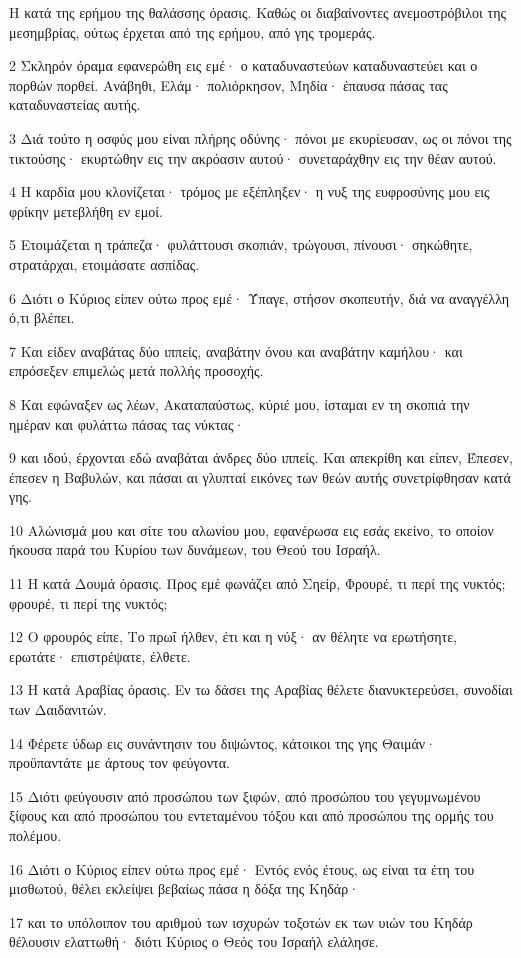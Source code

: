 \par Η κατά της ερήμου της θαλάσσης όρασις. Καθώς οι διαβαίνοντες ανεμοστρόβιλοι της μεσημβρίας, ούτως έρχεται από της ερήμου, από γης τρομεράς.
\par 2 Σκληρόν όραμα εφανερώθη εις εμέ· ο καταδυναστεύων καταδυναστεύει και ο πορθών πορθεί. Ανάβηθι, Ελάμ· πολιόρκησον, Μηδία· έπαυσα πάσας τας καταδυναστείας αυτής.
\par 3 Διά τούτο η οσφύς μου είναι πλήρης οδύνης· πόνοι με εκυρίευσαν, ως οι πόνοι της τικτούσης· εκυρτώθην εις την ακρόασιν αυτού· συνεταράχθην εις την θέαν αυτού.
\par 4 Η καρδία μου κλονίζεται· τρόμος με εξέπληξεν· η νυξ της ευφροσύνης μου εις φρίκην μετεβλήθη εν εμοί.
\par 5 Ετοιμάζεται η τράπεζα· φυλάττουσι σκοπιάν, τρώγουσι, πίνουσι· σηκώθητε, στρατάρχαι, ετοιμάσατε ασπίδας.
\par 6 Διότι ο Κύριος είπεν ούτω προς εμέ· Ύπαγε, στήσον σκοπευτήν, διά να αναγγέλλη ό,τι βλέπει.
\par 7 Και είδεν αναβάτας δύο ιππείς, αναβάτην όνου και αναβάτην καμήλου· και επρόσεξεν επιμελώς μετά πολλής προσοχής.
\par 8 Και εφώναξεν ως λέων, Ακαταπαύστως, κύριέ μου, ίσταμαι εν τη σκοπιά την ημέραν και φυλάττω πάσας τας νύκτας·
\par 9 και ιδού, έρχονται εδώ αναβάται άνδρες δύο ιππείς. Και απεκρίθη και είπεν, Έπεσεν, έπεσεν η Βαβυλών, και πάσαι αι γλυπταί εικόνες των θεών αυτής συνετρίφθησαν κατά γης.
\par 10 Αλώνισμά μου και σίτε του αλωνίου μου, εφανέρωσα εις εσάς εκείνο, το οποίον ήκουσα παρά του Κυρίου των δυνάμεων, του Θεού του Ισραήλ.
\par 11 Η κατά Δουμά όρασις. Προς εμέ φωνάζει από Σηείρ, Φρουρέ, τι περί της νυκτός; φρουρέ, τι περί της νυκτός;
\par 12 Ο φρουρός είπε, Το πρωΐ ήλθεν, έτι και η νύξ· αν θέλητε να ερωτήσητε, ερωτάτε· επιστρέψατε, έλθετε.
\par 13 Η κατά Αραβίας όρασις. Εν τω δάσει της Αραβίας θέλετε διανυκτερεύσει, συνοδίαι των Δαιδανιτών.
\par 14 Φέρετε ύδωρ εις συνάντησιν του διψώντος, κάτοικοι της γης Θαιμάν· προϋπαντάτε με άρτους τον φεύγοντα.
\par 15 Διότι φεύγουσιν από προσώπου των ξιφών, από προσώπου του γεγυμνωμένου ξίφους και από προσώπου του εντεταμένου τόξου και από προσώπου της ορμής του πολέμου.
\par 16 Διότι ο Κύριος είπεν ούτω προς εμέ· Εντός ενός έτους, ως είναι τα έτη του μισθωτού, θέλει εκλείψει βεβαίως πάσα η δόξα της Κηδάρ·
\par 17 και το υπόλοιπον του αριθμού των ισχυρών τοξοτών εκ των υιών του Κηδάρ θέλουσιν ελαττωθή· διότι Κύριος ο Θεός του Ισραήλ ελάλησε.

